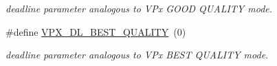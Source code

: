 \begin{DoxyCompactItemize}
\begin{DoxyCompactList}\small\item\em deadline parameter analogous to V\+Px G\+O\+OD Q\+U\+A\+L\+I\+TY mode. \end{DoxyCompactList}\item 
\#define \hyperlink{group__encoder_gab350573bea112f2fdf8e5677db3ac0da}{V\+P\+X\+\_\+\+D\+L\+\_\+\+B\+E\+S\+T\+\_\+\+Q\+U\+A\+L\+I\+TY}~(0)\hypertarget{group__encoder_gab350573bea112f2fdf8e5677db3ac0da}{}\label{group__encoder_gab350573bea112f2fdf8e5677db3ac0da}

\begin{DoxyCompactList}\small\item\em deadline parameter analogous to V\+Px B\+E\+ST Q\+U\+A\+L\+I\+TY mode. \end{DoxyCompactList}\end{DoxyCompactItemize}
